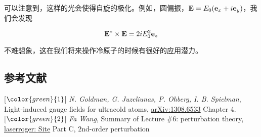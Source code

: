 可以注意到，这样的光会使得自旋的极化。例如，圆偏振，${\bf E} = E_0 ({\bf e}_x + i{\bf e}_y)$，我们会发现

\begin{equation}
{\bf E^*\times E} = 2i E_0^2{\bf e}_z
\end{equation}

不难想象，这在我们将来操作冷原子的时候有很好的应用潜力。

\subsection{参考文献}

[$\color{green}{1}$] {\emph{N. Goldman, G. Juzeliunas, P. Ohberg, I. B. Spielman}}, Light-induced gauge fields for ultracold atoms, \href{http://arxiv.org/abs/1308.6533}{arXiv:1308.6533} Chapter 4. \\

[$\color{green}{2}$] {\emph{Fa Wang}}, Summary of Lecture \#6: perturbation theory, \href{http://laserroger.github.io/PekingPhysics/ADVQM2014/Lectures/Lecture06.pdf}{laserroger: Site} Part C, $2$nd-order perturbation